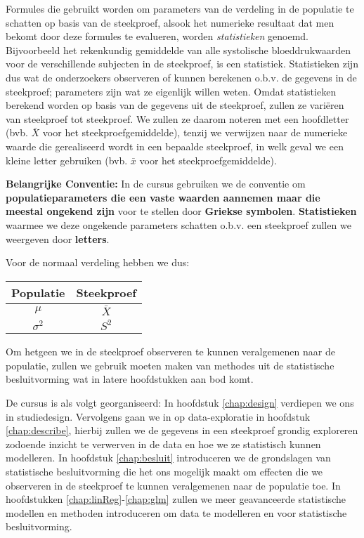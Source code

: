 \documentclass[12pt,dutch,coursenotes]{book}
\theoremstyle{definition}
\theoremstyle{definition}
\theoremstyle{definition}
\theoremstyle{remark}
\begin{document}
Formules die gebruikt worden om parameters van de verdeling in de
populatie te schatten op basis van de steekproef, alsook het numerieke
resultaat dat men bekomt door deze formules te evalueren, worden
\emph{statistieken} genoemd. Bijvoorbeeld het rekenkundig gemiddelde van
alle systolische bloeddrukwaarden voor de verschillende subjecten in de
steekproef, is een statistiek. Statistieken zijn dus wat de onderzoekers
observeren of kunnen berekenen o.b.v. de gegevens in de steekproef;
parameters zijn wat ze eigenlijk willen weten. Omdat statistieken
berekend worden op basis van de gegevens uit de steekproef, zullen ze
variëren van steekproef tot steekproef. We zullen ze daarom noteren met
een hoofdletter (bvb. \(\bar X\) voor het steekproefgemiddelde), tenzij
we verwijzen naar de numerieke waarde die gerealiseerd wordt in een
bepaalde steekproef, in welk geval we een kleine letter gebruiken (bvb.
\(\bar x\) voor het steekproefgemiddelde).

\textbf{Belangrijke Conventie:} In de cursus gebruiken we de conventie
om \textbf{populatieparameters die een vaste waarden aannemen maar die
meestal ongekend zijn} voor te stellen door \textbf{Griekse symbolen}.
\textbf{Statistieken} waarmee we deze ongekende parameters schatten
o.b.v. een steekproef zullen we weergeven door \textbf{letters}.

Voor de normaal verdeling hebben we dus:

\begin{longtable}[]{@{}cc@{}}
\toprule
Populatie & Steekproef\tabularnewline
\midrule
\endhead
\(\mu\) & \(\bar X\)\tabularnewline
\(\sigma^2\) & \(S^2\)\tabularnewline
\bottomrule
\end{longtable}

Om hetgeen we in de steekproef observeren te kunnen veralgemenen naar de
populatie, zullen we gebruik moeten maken van methodes uit de
statistische besluitvorming wat in latere hoofdstukken aan bod komt.

De cursus is als volgt georganiseerd: In hoofdstuk \ref{chap:design}
verdiepen we ons in studiedesign. Vervolgens gaan we in op
data-exploratie in hoofdstuk \ref{chap:describe}, hierbij zullen we de
gegevens in een steekproef grondig exploreren zodoende inzicht te
verwerven in de data en hoe we ze statistisch kunnen modelleren. In
hoofdstuk \ref{chap:besluit} introduceren we de grondslagen van
statistische besluitvorming die het ons mogelijk maakt om effecten die
we observeren in de steekproef te kunnen veralgemenen naar de populatie
toe. In hoofdstukken \ref{chap:linReg}-\ref{chap:glm} zullen we meer
geavanceerde statistische modellen en methoden introduceren om data te
modelleren en voor statistische besluitvorming.
\end{document}
